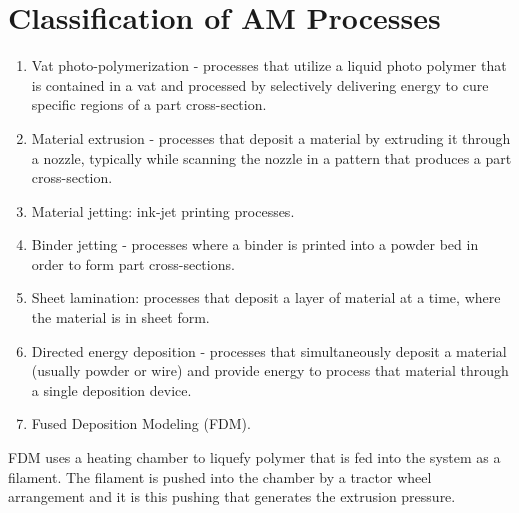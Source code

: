 \section{Classification of AM Processes}
\begin{enumerate}
\item Vat photo-polymerization - processes that utilize a liquid photo polymer that is
contained in a vat and processed by selectively delivering energy to cure specific
regions of a part cross-section.
\item Material extrusion - processes that deposit a material by extruding it through a
nozzle, typically while scanning the nozzle in a pattern that produces a part
cross-section.
\item Material jetting: ink-jet printing processes.
\item Binder jetting - processes where a binder is printed into a powder bed in order to
form part cross-sections.
\item Sheet lamination: processes that deposit a layer of material at a time, where the
material is in sheet form.
\item Directed energy deposition - processes that simultaneously deposit a material
(usually powder or wire) and provide energy to process that material through a
single deposition device.
\item Fused Deposition Modeling (FDM).
\end{enumerate}
FDM uses a
heating chamber to liquefy polymer that is fed into the system as a filament. The filament is pushed into the chamber by a tractor wheel arrangement and it is this
pushing that generates the extrusion pressure\cite{classnotes}.

